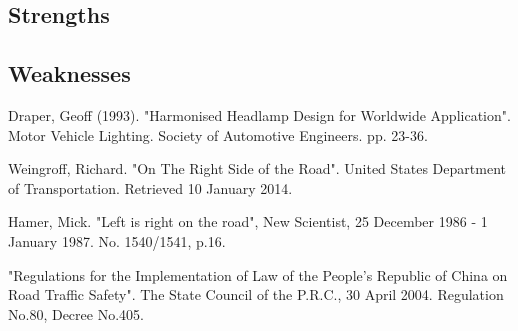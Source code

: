 \subsection{Strengths}
	
\subsection{Weaknesses}




\begin{thebibliography}{99}

 Draper, Geoff (1993). "Harmonised 
Headlamp Design for Worldwide Application". Motor Vehicle 
Lighting. Society of Automotive Engineers. pp. 23-36.

 Weingroff, Richard. "On The 
Right Side of the Road". United States Department of 
Transportation. Retrieved 10 January 2014.

 Hamer, Mick. "Left is right on the 
road", New Scientist, 25 December 1986 - 1 January 1987. No.
1540/1541, p.16.

 "Regulations for the Implementation of Law of the People's Republic of China on 
Road Traffic Safety". The State Council of the P.R.C., 30 
April 2004. Regulation No.80, Decree No.405.

\end{thebibliography}

